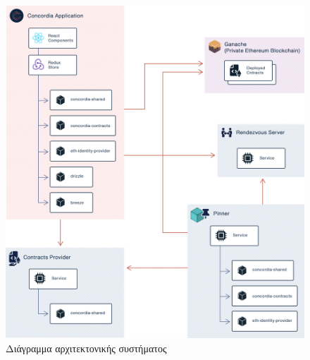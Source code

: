 \begin{figure}[H]
    \centering
    \includegraphics[width=\textwidth]{assets/figures/chapter-4/4.3.architecture-architecture-overview.png}
    \caption{Διάγραμμα αρχιτεκτονικής συστήματος}
    \label{figure:4-3-architecture-overview}
\end{figure}

\newpage








